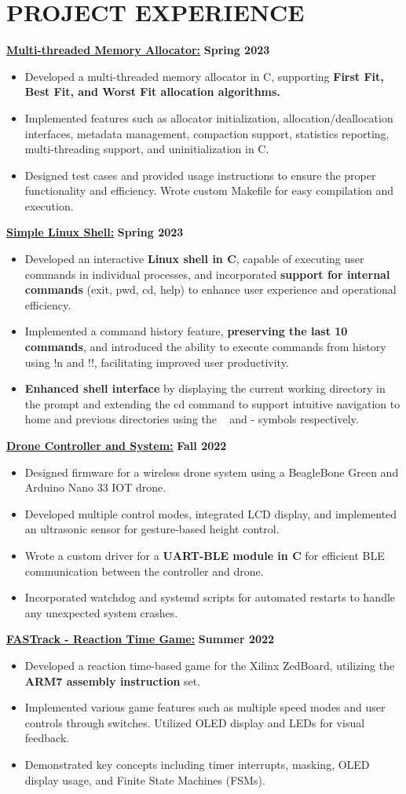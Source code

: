 \documentclass[letterpaper,11pt]{article}
\newcommand{\Item} [1] {
    \item\small{{#1 \vspace{-2pt}}}
}
\newcommand{\resumeItemListStart} [0] {
    \vspace{2pt}
    \begin{itemize}[topsep=0pt,itemsep=-2pt]
}
\newcommand{\resumeItemListEnd} [0] {
    \end{itemize}
    \vspace{5pt}
}
\begin{document}
    \section{PROJECT EXPERIENCE}
    \href{https://github.com/SatireSage/Multi-threaded-Memory-Allocator}{{\color{colorValue}} \underline{\textbf{Multi-threaded Memory Allocator:}}} \hfill \textbf{Spring 2023}
    \resumeItemListStart{}
        \Item{Developed a multi-threaded memory allocator in C, supporting \textbf{First Fit, Best Fit, and Worst Fit allocation algorithms.}}
        \Item{Implemented features such as allocator initialization, allocation/deallocation interfaces, metadata management, compaction support, statistics reporting, multi-threading support, and uninitialization in C.}
        \Item{Designed test cases and provided usage instructions to ensure the proper functionality and efficiency. Wrote custom Makefile for easy compilation and execution.}
    \resumeItemListEnd{}
    \href{https://github.com/SatireSage/Simple-Linux-Shell}{{\color{colorValue}} \underline{\textbf{Simple Linux Shell:}}} \hfill \textbf{Spring 2023}
    \resumeItemListStart{}
        \Item{Developed an interactive \textbf{Linux shell in C}, capable of executing user commands in individual processes, and incorporated \textbf{support for internal commands} (exit, pwd, cd, help) to enhance user experience and operational efficiency.}
        \Item{Implemented a command history feature, \textbf{preserving the last 10 commands}, and introduced the ability to execute commands from history using !n and !!, facilitating improved user productivity.}
        \Item{\textbf{Enhanced shell interface} by displaying the current working directory in the prompt and extending the cd command to support intuitive navigation to home and previous directories using the ~ and - symbols respectively.}
    \resumeItemListEnd{}
    \href{https://github.com/SatireSage/Dronee}{{\color{colorValue}} \underline{\textbf{Drone Controller and System:}}} \hfill \textbf{Fall 2022}
    \resumeItemListStart{}
        \Item{Designed firmware for a wireless drone system using a BeagleBone Green and Arduino Nano 33 IOT drone.}
        \Item{Developed multiple control modes, integrated LCD display, and implemented an ultrasonic sensor for gesture-based height control.}
        \Item{Wrote a custom driver for a \textbf{UART-BLE module in C} for efficient BLE communication between the controller and drone.}
        \Item{Incorporated watchdog and systemd scripts for automated restarts to handle any unexpected system crashes.}
    \resumeItemListEnd{}
    \href{https://github.com/SatireSage/FASTrack}{{\color{colorValue}} \underline{\textbf{FASTrack - Reaction Time Game:}}} \hfill \textbf{Summer 2022}
    \resumeItemListStart{}
        \Item{Developed a reaction time-based game for the Xilinx ZedBoard, utilizing the \textbf{ARM7 assembly instruction} set.}
        \Item{Implemented various game features such as multiple speed modes and user controls through switches. Utilized OLED display and LEDs for visual feedback.}
        \Item{Demonstrated key concepts including timer interrupts, masking, OLED display usage, and Finite State Machines (FSMs).}
    \resumeItemListEnd{}
\end{document}
